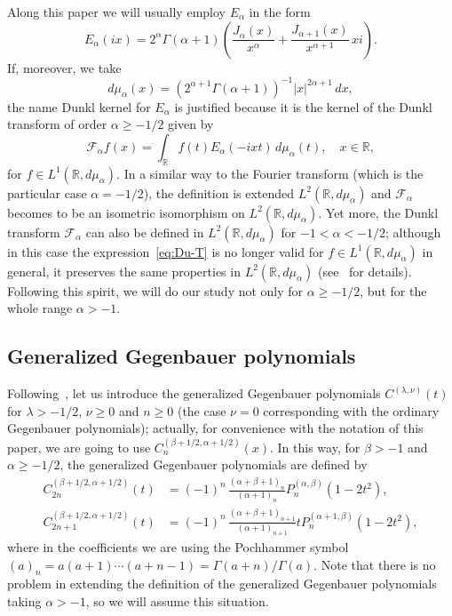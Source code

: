 \documentclass[12pt,a4paper]{amsart}
\theoremstyle{plain}
\theoremstyle{definition}
\newcommand{\R}{\mathbb{R}}
\newcommand{\calF}{\mathcal{F}}
\begin{document}
Along this paper we will usually employ $E_\alpha$ in the form
\begin{equation}
\label{eq:Ea}
  E_{\alpha}(ix) = 2^{\alpha}\Gamma(\alpha+1)
  \left( \frac{J_{\alpha}(x)}{x^{\alpha}}+\frac{J_{\alpha+1}(x)}
    {x^{\alpha+1}}\,xi\right).
\end{equation}
If, moreover, we take
\[
  d\mu_{\alpha}(x) = (2^{\alpha+1} \Gamma(\alpha+1))^{-1}|x|^{2\alpha+1}\,dx,
\]
the name Dunkl kernel for $E_\alpha$ is justified because it is the kernel 
of the Dunkl transform of order $\alpha \geq -1/2$ given by
\begin{equation}
\label{eq:Du-T}
  \calF_{\alpha}f(x) = \int_{\R} f(t)E_{\alpha}(-ixt)
  \,d\mu_{\alpha}(t),\quad x\in \R,
\end{equation}
for $f\in L^{1}(\R,d\mu_{\alpha})$.
In a similar way to the Fourier transform (which is the particular
case $\alpha = -1/2$), the definition is extended $L^{2}(\R,d\mu_{\alpha})$ 
and $\calF_{\alpha}$ becomes to be an isometric isomorphism on $L^{2}(\R,d\mu_{\alpha})$.
Yet more, the Dunkl transform $\calF_{\alpha}$ can also be defined in
$L^2(\R,d\mu_{\alpha})$ for $-1 < \alpha < -1/2$; although in this case the
expression~\eqref{eq:Du-T} is no longer valid for
$f\in L^1(\R,d\mu_{\alpha})$ in general, it preserves the same properties in
$L^2(\R,d\mu_{\alpha})$ (see~\cite{Rosenblum} for details).
Following this spirit, we will do our study not only for $\alpha\ge-1/2$, 
but for the whole range $\alpha > -1$.

\subsection{Generalized Gegenbauer polynomials}

Following~\cite[Definition~1.5.5, p.~27]{DX}, let us introduce the generalized
Gegenbauer polynomials $C^{(\lambda,\nu)}(t)$ for $\lambda>-1/2$, $\nu \ge 0$
and $n \ge 0$
(the case $\nu=0$ corresponding with the ordinary Gegenbauer polynomials);
actually, for convenience with the notation of this paper,
we are going to use $C_n^{(\beta+1/2,\alpha+1/2)}(x)$. In this way, for $\beta>-1$
and $\alpha\ge -1/2$, the generalized Gegenbauer polynomials are defined by
\begin{align}
\label{eq:C2n}
  C_{2n}^{(\beta+1/2,\alpha+1/2)}(t)
  &= (-1)^n \, \frac{(\alpha+\beta+1)_n}{(\alpha+1)_n} P_n^{(\alpha,\beta)}(1-2t^2), \\
\label{eq:C2n1}
  C_{2n+1}^{(\beta+1/2,\alpha+1/2)}(t)
  &= (-1)^n \, \frac{(\alpha+\beta+1)_{n+1}}{(\alpha+1)_{n+1}} t P_n^{(\alpha+1,\beta)}(1-2t^2),
\end{align}
where in the coefficients we are using the Pochhammer symbol
$(a)_n = a(a+1)\cdots(a+n-1) = \Gamma(a+n)/\Gamma(a)$. 
Note that there is no problem in extending the definition of the generalized Gegenbauer 
polynomials taking $\alpha>-1$, so we will assume this situation.
\end{document}
